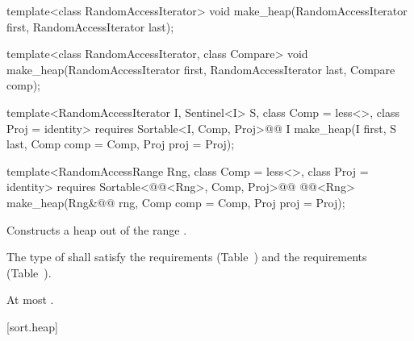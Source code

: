 %
\begin{removedblock}
\begin{itemdecl}
template<class RandomAccessIterator>
  void make_heap(RandomAccessIterator first, RandomAccessIterator last);

template<class RandomAccessIterator, class Compare>
  void make_heap(RandomAccessIterator first, RandomAccessIterator last,
                 Compare comp);
\end{itemdecl}
\end{removedblock}
\begin{addedblock}
\begin{itemdecl}
template<RandomAccessIterator I, Sentinel<I> S, class Comp = less<>,
    class Proj = identity>
  requires Sortable<I, Comp, Proj>@\newtxt{()}@
  I make_heap(I first, S last, Comp comp = Comp{}, Proj proj = Proj{});

template<RandomAccessRange Rng, class Comp = less<>, class Proj = identity>
  requires Sortable<@@<Rng>, Comp, Proj>@\newtxt{()}@
  @@<Rng>
    make_heap(Rng&@\newtxt{\&}@ rng, Comp comp = Comp{}, Proj proj = Proj{});
\end{itemdecl}
\end{addedblock}

\begin{itemdescr}
\pnum
\effects
Constructs a heap out of the range
.

\begin{removedblock}
\pnum
\requires The type of  shall satisfy
the  requirements
(Table~) and the
 requirements
(Table~).
\end{removedblock}

\begin{addedblock}
\pnum
\returns {}
\end{addedblock}

\pnum
\complexity
At most
.
\end{itemdescr}

[sort.heap]{}

